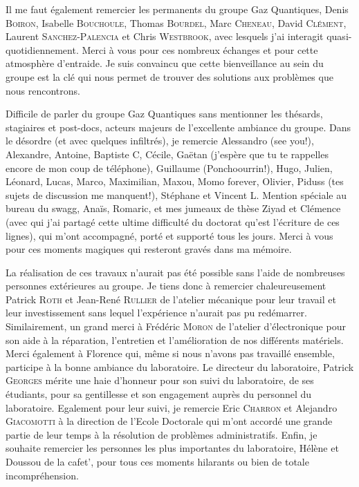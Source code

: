 Il me faut également remercier les permanents du groupe Gaz Quantiques, Denis \textsc{Boiron}, Isabelle \textsc{Bouchoule}, Thomas \textsc{Bourdel}, Marc \textsc{Cheneau}, David \textsc{Clément}, Laurent \textsc{Sanchez-Palencia} et Chris \textsc{Westbrook}, avec lesquels j'ai interagit quasi-quotidiennement. Merci à vous pour ces nombreux échanges et pour cette atmosphère d'entraide. Je suis convaincu que cette bienveillance au sein du groupe est la clé qui nous permet de trouver des solutions aux problèmes que nous rencontrons. 

Difficile de parler du groupe Gaz Quantiques sans mentionner les thésards, stagiaires et post-docs, acteurs majeurs de l'excellente ambiance du groupe. Dans le désordre (et avec quelques infiltrés), je remercie Alessandro (see you!), Alexandre, Antoine, Baptiste C, Cécile, Gaëtan (j'espère que tu te rappelles encore de mon coup de téléphone), Guillaume (Ponchoourrin!), Hugo, Julien, Léonard, Lucas, Marco, Maximilian, Maxou, Momo forever, Olivier, Piduss (tes sujets de discussion me manquent!), Stéphane et Vincent L. Mention spéciale au bureau du swagg, Anaïs, Romaric, et mes jumeaux de thèse Ziyad et Clémence (avec qui j'ai partagé cette ultime difficulté du doctorat qu'est l'écriture de ces lignes), qui m'ont accompagné, porté et supporté tous les jours. Merci à vous pour ces moments magiques qui resteront gravés dans ma mémoire. 

La réalisation de ces travaux n'aurait pas été possible sans l'aide de nombreuses personnes extérieures au groupe. Je tiens donc à remercier chaleureusement Patrick \textsc{Roth} et Jean-René \textsc{Rullier} de l'atelier mécanique pour leur travail et leur investissement sans lequel l'expérience n'aurait pas pu redémarrer. Similairement, un grand merci à Frédéric \textsc{Moron} de l'atelier d'électronique pour son aide à la réparation, l'entretien et l'amélioration de nos différents matériels. Merci également à Florence qui, même si nous n'avons pas travaillé ensemble, participe à la bonne ambiance du laboratoire. Le directeur du laboratoire, Patrick \textsc{Georges} mérite une haie d'honneur pour son suivi du laboratoire, de ses étudiants, pour sa gentillesse et son engagement auprès du personnel du laboratoire. Egalement pour leur suivi, je remercie Eric \textsc{Charron} et Alejandro \textsc{Giacomotti} à la direction de l'Ecole Doctorale qui m'ont accordé une grande partie de leur temps à la résolution de problèmes administratifs. Enfin, je souhaite remercier les personnes les plus importantes du laboratoire, Hélène et Doussou de la cafet', pour tous ces moments hilarants ou bien de totale incompréhension. 


